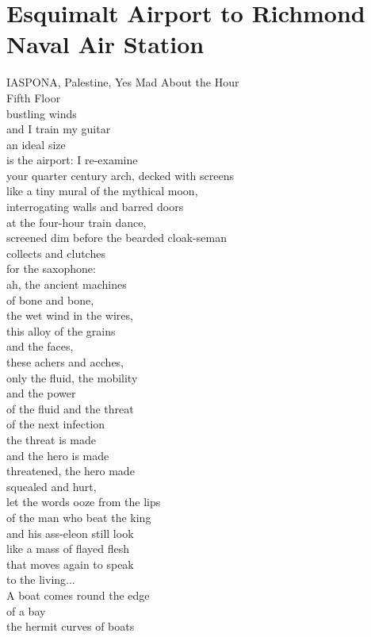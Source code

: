 \documentclass[smalldemyvopaper,11pt,twoside,onecolumn,openright,extrafontsizes]{memoir}
\begin{document}
\chapter{Esquimalt Airport to Richmond Naval Air Station}
IASPONA, Palestine, Yes Mad About the Hour
\\Fifth Floor
\\bustling winds
\\and I train my guitar
\\an ideal size
\\is the airport: I re-examine
\\your quarter century arch, decked with screens
\\like a tiny mural of the mythical moon,
\\interrogating walls and barred doors
\\at the four-hour train dance,
\\screened dim before the bearded cloak-seman
\\collects and clutches
\\for the saxophone:
\\ah, the ancient machines
\\of bone and bone,
\\the wet wind in the wires,
\\this alloy of the grains
\\and the faces,
\\these achers and acches,
\\only the fluid, the mobility
\\and the power
\\of the fluid and the threat
\\of the next infection
\\the threat is made
\\and the hero is made
\\threatened, the hero made
\\squealed and hurt,
\\let the words ooze from the lips
\\of the man who beat the king
\\and his ass-eleon still look
\\like a mass of flayed flesh
\\that moves again to speak
\\to the living...
\\A boat comes round the edge
\\of a bay
\\the hermit curves of boats
\end{document}

